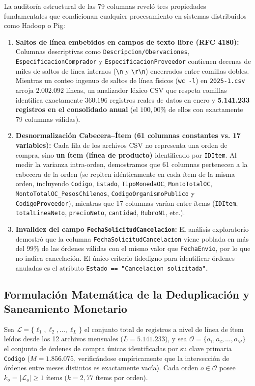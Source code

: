 \documentclass[11pt,a4paper]{article}
\begin{document}
La auditoría estructural de las 79 columnas reveló tres propiedades fundamentales que condicionan cualquier procesamiento en sistemas distribuidos como Hadoop o Pig:
\begin{enumerate}
    \item \textbf{Saltos de línea embebidos en campos de texto libre (RFC 4180):} Columnas descriptivas como \texttt{Descripcion/Obervaciones}, \texttt{EspecificacionComprador} y \texttt{EspecificacionProveedor} contienen decenas de miles de saltos de línea internos (\texttt{\textbackslash n} y \texttt{\textbackslash r\textbackslash n}) encerrados entre comillas dobles. Mientras un conteo ingenuo de saltos de línea físicos (\texttt{wc -l}) en \texttt{2025-1.csv} arroja $2.002.092$ líneas, un analizador léxico CSV que respeta comillas identifica exactamente $360.196$ registros reales de datos en enero y \textbf{5.141.233 registros en el consolidado anual} (el $100,00\%$ de ellos con exactamente 79 columnas válidas).
    \item \textbf{Desnormalización Cabecera--Ítem (61 columnas constantes vs. 17 variables):} Cada fila de los archivos CSV no representa una orden de compra, sino \textbf{un ítem (línea de producto)} identificado por \texttt{IDItem}. Al medir la varianza intra-orden, demostramos que 61 columnas pertenecen a la cabecera de la orden (se repiten idénticamente en cada ítem de la misma orden, incluyendo \texttt{Codigo}, \texttt{Estado}, \texttt{TipoMonedaOC}, \texttt{MontoTotalOC}, \texttt{MontoTotalOC\_PesosChilenos}, \texttt{CodigoOrganismoPublico} y \texttt{CodigoProveedor}), mientras que 17 columnas varían entre ítems (\texttt{IDItem}, \texttt{totalLineaNeto}, \texttt{precioNeto}, \texttt{cantidad}, \texttt{RubroN1}, etc.).
    \item \textbf{Invalidez del campo \texttt{FechaSolicitudCancelacion}:} El análisis exploratorio demostró que la columna \texttt{FechaSolicitudCancelacion} viene poblada en más del $99\%$ de las órdenes válidas con el mismo valor que \texttt{FechaEnvio}, por lo que no indica cancelación. El único criterio fidedigno para identificar órdenes anuladas es el atributo \texttt{Estado == "Cancelacion solicitada"}.
\end{enumerate}

\subsection{Formulación Matemática de la Deduplicación y Saneamiento Monetario}

Sea $\mathcal{L} = \{ \ell_1, \ell_2, \dots, \ell_L \}$ el conjunto total de registros a nivel de línea de ítem leídos desde los 12 archivos mensuales ($L = 5.141.233$), y sea $\mathcal{O} = \{ o_1, o_2, \dots, o_M \}$ el conjunto de órdenes de compra únicas identificadas por su clave primaria \texttt{Codigo} ($M = 1.856.075$, verificándose empíricamente que la intersección de órdenes entre meses distintos es exactamente vacía). Cada orden $o \in \mathcal{O}$ posee $k_o = |\mathcal{L}_o| \ge 1$ ítems ($\bar{k} = 2,77$ ítems por orden).
\end{document}
